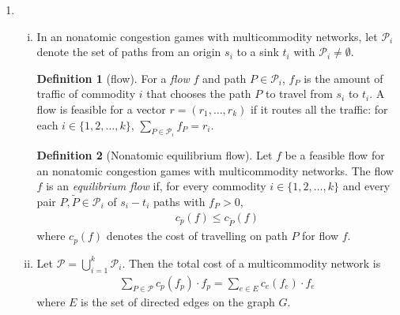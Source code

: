 \documentclass[a4paper,12pt]{article}
\theoremstyle{definition}
\newtheorem*{defn}{Definition}
\begin{document}
\begin{enumerate}
\item 
\begin{enumerate}[(i)]
\item In an nonatomic congestion games with multicommodity networks, let $\mathcal{P}_i$ denote the set of paths from an origin $s_i$ to a sink $t_i$ with $\mathcal{P}_i\neq \emptyset$.
\begin{defn}[flow]
For a \emph{flow} $f$ and path $P \in \mathcal{P}_i$, $f_P$ is the amount of traffic of commodity $i$ that chooses the path $P$ to travel from $s_i$ to $t_i$. A flow is feasible for a vector $r=(r_1,\ldots,r_k)$ if it routes all the traffic: for each $i\in \{1, 2, \ldots, k\}$, $\sum_{P\in \mathcal{P}_i}f_P=r_i$.
\end{defn}
\begin{defn}[Nonatomic equilibrium flow]
Let $f$ be a feasible flow for an nonatomic congestion games with multicommodity networks. The flow $f$ is an \emph{equilibrium flow} if, for every commodity $i \in \{1,2, \ldots, k\}$ and every pair $P, \tilde{P} \in \mathcal{P}_i$ of $s_i-t_i$ paths with $f_P>0$, 
\begin{align*}
c_p(f) \leq c_{\tilde{P}}(f)
\end{align*}
where $c_p(f)$ denotes the cost of travelling on path $P$ for flow $f$.
\end{defn}
\item Let $\mathcal{P}=\bigcup_{i=1}^{k}\mathcal{P}_i$. Then the total cost of a multicommodity network is 
\begin{align*}
\sum_{P\in \mathcal{P}}c_p(f_p)\cdot f_p = \sum_{e\in E}c_e(f_e)\cdot f_e
\end{align*}
where $E$ is the set of directed edges on the graph $G$.


\end{enumerate}
\end{enumerate}
\end{document}
